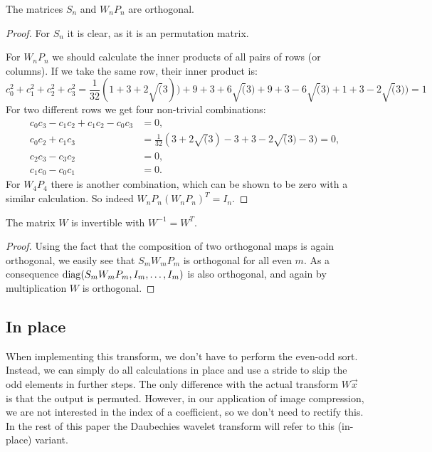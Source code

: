 \begin{lemma}
	The matrices $S_n$ and $W_n P_n$ are orthogonal.
\end{lemma}
\begin{proof}
	For $S_n$ it is clear, as it is an permutation matrix.

	For $W_n P_n$ we should calculate the inner products of all pairs of rows (or columns). If we take the same row, their inner product is:
	\[ c_0^2 + c_1^2 + c_2^2 + c_3^2 = \frac{1}{32}(1 + 3 + 2\sqrt(3)) + 9 + 3 + 6\sqrt(3) + 9 + 3 - 6\sqrt(3) + 1 + 3 -2\sqrt(3)) = 1 \]
	For two different rows we get four non-trivial combinations:
	\begin{align}
		c_0c_3 - c_1c_2 + c_1c_2 - c_0c_3 &= 0, \\
		c_0c_2 + c_1c_3 &= \frac{1}{32}(3+2\sqrt(3)-3+3-2\sqrt(3)-3) = 0, \\
		c_2c_3 - c_3c_2 &= 0, \\
		c_1c_0 - c_0c_1 &= 0.
	\end{align}
	For $W_4 P_4$ there is another combination, which can be shown to be zero with a similar calculation. So indeed $W_n P_n (W_n P_n)^T = I_n$.
\end{proof}

\begin{theorem}
	The matrix $W$ is invertible with $W^{-1} = W^T$.
\end{theorem}
\begin{proof}
	Using the fact that the composition of two orthogonal maps is again orthogonal, we easily see that $S_m W_m P_m$ is orthogonal for all even $m$. As a consequence $\operatorname{diag}(S_m W_m P_m, I_m, \ldots, I_m)$ is also orthogonal, and again by multiplication $W$ is orthogonal.
\end{proof}


\subsection{In place}
When implementing this transform, we don't have to perform the even-odd sort. Instead, we can simply do all calculations in place and use a stride to skip the odd elements in further steps. The only difference with the actual transform $W \vec{x}$ is that the output is permuted. However, in our application of image compression, we are not interested in the index of a coefficient, so we don't need to rectify this. In the rest of this paper the Daubechies wavelet transform will refer to this (in-place) variant.

